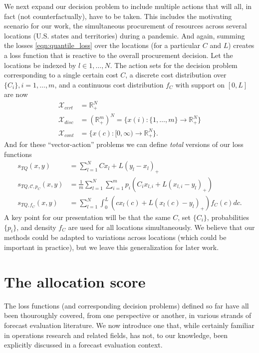 \documentclass{article}
\begin{document}
We next expand our decision problem to include multiple actions that will all, in fact (not counterfactually), have to be taken.  This includes the motivating scenario for our work, the simultaneous procurement of resources across several locations (U.S. states and territories) during a pandemic. And again, summing the losses  \eqref{eqn:quantile_loss} over the locations (for a particular $C$ and $L$) creates a loss function that is reactive to the overall procurement decision. Let the locations be indexed by $l \in 1,\ldots,N$.  The action sets for the decision problem corresponding to a single certain cost $C$, a discrete cost distribution over $\{C_i\}, i = 1,\ldots,m$, and a continuous cost distribution $f_C$ with support on $[0,L]$ are now
\begin{align}
\mathcal{X}_{cert} &= \mathbb{R}_{+}^N \\
\mathcal{X}_{disc} &= (\mathbb{R}_{+}^m)^N = \{x(i):\{1,\ldots,m\} \to \mathbb{R}_{+}^N\}\\
\mathcal{X}_{cont} &= \{x(c):[0,\infty) \to \mathbb{R}_{+}^N\}.
\end{align}
And for these ``vector-action'' problems we can define \emph{total} versions of our loss functions
\begin{align}
s_{TQ}(x,y) &= \sum_{l=1}^N Cx_l + L(y_l-x_l)_+ \label{eqn:TQ_loss} \\
s_{TQ, \mathcal{C}, p_C}(x,y) &= \frac{1}{m}\sum_{l=1}^N \sum_{i=1}^{m}p_i(C_i x_{l,i} + L(x_{l,i} - y_l)_+)\\
s_{TQ, f_C}(x,y) &= \sum_{l=1}^N \int_{0}^{L} (cx_l(c) + L(x_l(c) - y_l)_+) f_C(c)dc.
\end{align}
A key point for our presentation will be that the same $C$, set $\{C_i\}$, probabilities $\{p_i\}$, and density $f_C$ are used for all locations simultaneously.  We believe that our methods could be adapted to variations across locations (which could be important in practice), but we leave this generalization for later work. 

\section{The allocation score}

The loss functions (and corresponding decision problems) defined so far have all been thouroughly covered, from one perspective or another, in various strands of forecast evaluation literature.  We now introduce one that, while certainly familiar in operations research and related fields, has not, to our knowledge, been explicitly discussed in a forecast evaluation context. 
\end{document}
